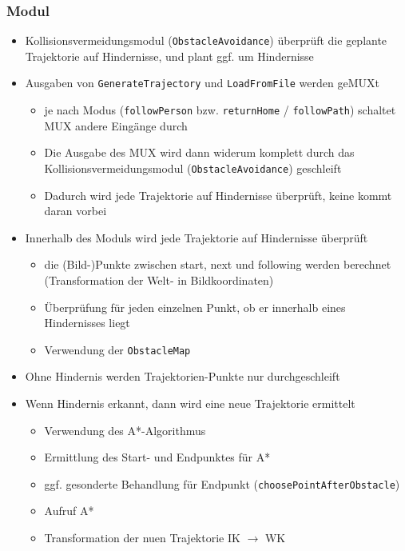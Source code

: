 \subsubsection{Modul}
\authorsection{\editortobias}

\begin{itemize}
 
  \item Kollisionsvermeidungsmodul (\lstinline{ObstacleAvoidance}) überprüft die geplante Trajektorie auf Hindernisse, und plant ggf. um Hindernisse
  \item Ausgaben von \lstinline{GenerateTrajectory} und \lstinline{LoadFromFile} werden geMUXt
  \begin{itemize}
    \item je nach Modus (\lstinline{followPerson} bzw. \lstinline{returnHome} / \lstinline{followPath}) schaltet MUX andere Eingänge durch
  	\item Die Ausgabe des MUX wird dann widerum komplett durch das Kollisionsvermeidungsmodul (\lstinline{ObstacleAvoidance}) geschleift
    \item Dadurch wird jede Trajektorie auf Hindernisse überprüft, keine kommt \glqq daran vorbei\grqq
  \end{itemize}
  \item Innerhalb des Moduls wird jede Trajektorie auf Hindernisse überprüft
	\begin{itemize}
	  \item die (Bild-)Punkte zwischen start, next und following werden berechnet (Transformation der Welt- in Bildkoordinaten)
	  \item Überprüfung für jeden einzelnen Punkt, ob er innerhalb eines Hindernisses liegt
	  \item Verwendung der \lstinline{ObstacleMap} 
	\end{itemize}
  \item Ohne Hindernis werden Trajektorien-Punkte nur durchgeschleift
  \item Wenn Hindernis erkannt, dann wird eine neue Trajektorie ermittelt
  \begin{itemize}
    \item Verwendung des A*-Algorithmus
    \item Ermittlung des Start- und Endpunktes für A*
    \item ggf. gesonderte Behandlung für Endpunkt (\lstinline{choosePointAfterObstacle})
    \item Aufruf A*
    \item Transformation der nuen Trajektorie IK $\rightarrow$ WK
  \end{itemize}

\end{itemize}



